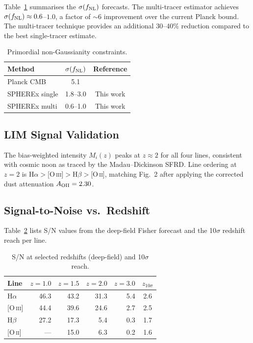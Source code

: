 \documentclass[12pt]{article}
\begin{document}
Table~\ref{tab:fnl} summarises the $\sigma(f_{\rm NL})$ forecasts.
The multi-tracer estimator achieves $\sigma(f_{\rm NL}) \approx 0.6$--$1.0$,
a factor of $\sim$6 improvement over the current Planck bound.  The
multi-tracer technique provides an additional 30--40\% reduction compared
to the best single-tracer estimate.

\begin{table}[h]
\centering
\caption{Primordial non-Gaussianity constraints.}
\label{tab:fnl}
\begin{tabular}{lcc}
\toprule
Method & $\sigma(f_{\rm NL})$ & Reference \\
\midrule
Planck CMB         & 5.1     & \citet{Planck2020} \\
SPHEREx single     & 1.8--3.0 & This work \\
SPHEREx multi      & 0.6--1.0 & This work \\
\bottomrule
\end{tabular}
\end{table}

\subsection{LIM Signal Validation}

The bias-weighted intensity $M_i(z)$ peaks at $z \approx 2$ for all four
lines, consistent with cosmic noon as traced by the Madau--Dickinson SFRD.
Line ordering at $z = 2$ is H$\alpha > {}$[O\,\textsc{iii}]$
> {}$H$\beta > {}$[O\,\textsc{ii}], matching \citet{Cheng2024} Fig.~2 after
applying the corrected dust attenuation $A_{\rm OII} = 2.30$.

\subsection{Signal-to-Noise vs.\ Redshift}

Table~\ref{tab:snr} lists S/N values from the deep-field Fisher forecast
and the 10$\sigma$ redshift reach per line.

\begin{table}[h]
\centering
\caption{S/N at selected redshifts (deep-field) and 10$\sigma$ reach.}
\label{tab:snr}
\begin{tabular}{lrrrrc}
\toprule
Line & $z{=}1.0$ & $z{=}1.5$ & $z{=}2.0$ & $z{=}3.0$ & $z_{10\sigma}$ \\
\midrule
H$\alpha$              & 46.3 & 43.2 & 31.3 & 5.4 & 2.6 \\
{[O\,\textsc{iii}]}   & 44.4 & 39.6 & 24.6 & 2.7 & 2.5 \\
H$\beta$               & 27.2 & 17.3 &  5.4 & 0.3 & 1.7 \\
{[O\,\textsc{ii}]}    &  ---  & 15.0 &  6.3 & 0.2 & 1.6 \\
\bottomrule
\end{tabular}
\end{table}
\end{document}

